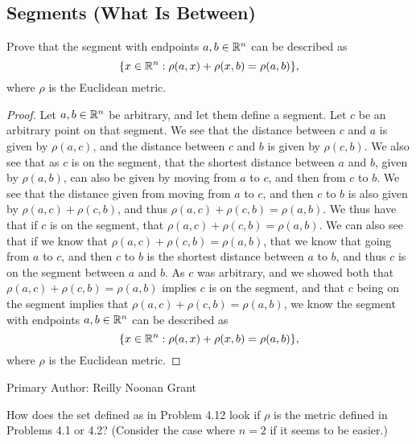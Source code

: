 \subsection{Segments (What Is Between)}

\begin{minorEx}%
    Prove that the segment with endpoints $a,b \in \mathbb{R}^n$ can be described as 
    \[
        \{x \in \mathbb{R}^n : \rho(a,x) + \rho(x,b) = \rho(a, b)\},
    \]
    where $\rho$ is the Euclidean metric.
\end{minorEx}

\begin{proof}
  Let $a,b \in \mathbb{R}^n$ be arbitrary, and let them define a segment. Let
  $c$ be an arbitrary point on that segment. We see that the distance
  between $c$ and $a$ is given by $\rho(a,c)$, and the distance
  between $c$ and $b$ is given by $\rho(c,b)$. We also see that as $c$
  is on the segment, that the shortest distance between $a$ and $b$,
  given by $\rho(a,b)$, can also be given by moving from $a$ to $c$,
  and then from $c$ to $b$. We see that the distance given from moving
  from $a$ to $c$, and then $c$ to $b$ is also given by
  $\rho(a,c)+\rho(c,b)$, and thus $\rho(a,c)+\rho(c,b)= \rho(a,b)$. We
  thus have that if $c$ is on the segment, that $\rho(a,c)+\rho(c,b)=
  \rho(a,b)$. We can also see that if we know that $\rho(a,c)+\rho(c,b)=
  \rho(a,b)$, that we know that going from $a$ to $c$, and then $c$ to
  $b$ is the shortest distance between $a$ to $b$, and thus $c$ is on
  the segment between $a$ and $b$. As $c$ was arbitrary, and we showed
  both that $\rho(a,c)+\rho(c,b)= \rho(a,b)$ implies $c$ is on the
  segment, and that $c$ being on the segment implies that
  $\rho(a,c)+\rho(c,b)= \rho(a,b)$, we know the 
  segment with endpoints $a,b \in \mathbb{R}^n$ can be described as 
    \[
        \{x \in \mathbb{R}^n : \rho(a,x) + \rho(x,b) = \rho(a, b)\},
    \]
    where $\rho$ is the Euclidean metric.
\end{proof}

Primary Author: Reilly Noonan Grant

\begin{minorEx}%
    How does the set defined as in Problem 4.12 look if $\rho$ is the metric
    defined in Problems 4.1 or 4.2? (Consider the case where $n = 2$ if it seems
    to be easier.)
\end{minorEx}

